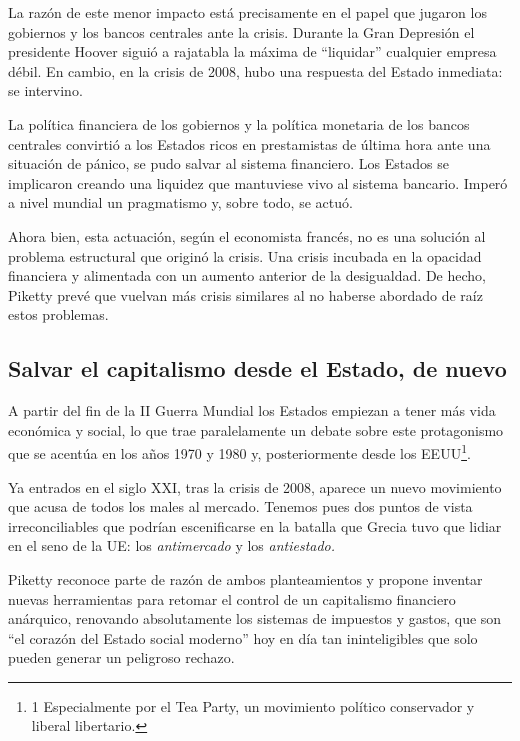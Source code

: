\documentclass[
]{article}
\begin{document}
La razón de este menor impacto está precisamente en el papel que jugaron
los gobiernos y los bancos centrales ante la crisis. Durante la Gran
Depresión el presidente Hoover siguió a rajatabla la máxima de
``liquidar'' cualquier empresa débil. En cambio, en la crisis de 2008,
hubo una respuesta del Estado inmediata: se intervino.

La política financiera de los gobiernos y la política monetaria de los
bancos centrales convirtió a los Estados ricos en prestamistas de última
hora ante una situación de pánico, se pudo salvar al sistema financiero.
Los Estados se implicaron creando una liquidez que mantuviese vivo al
sistema bancario. Imperó a nivel mundial un pragmatismo y, sobre todo,
se actuó.

Ahora bien, esta actuación, según el economista francés, no es una
solución al problema estructural que originó la crisis. Una crisis
incubada en la opacidad financiera y alimentada con un aumento anterior
de la desigualdad. De hecho, Piketty prevé que vuelvan más crisis
similares al no haberse abordado de raíz estos problemas.

\hypertarget{salvar-el-capitalismo-desde-el-estado-de-nuevo}{%
\subsection{Salvar el capitalismo desde el Estado, de
nuevo}\label{salvar-el-capitalismo-desde-el-estado-de-nuevo}}

A partir del fin de la II Guerra Mundial los Estados empiezan a tener
más vida económica y social, lo que trae paralelamente un debate sobre
este protagonismo que se acentúa en los años 1970 y 1980 y,
posteriormente desde los EEUU\footnote{1 Especialmente por el Tea Party,
  un movimiento político conservador y liberal libertario.}.

Ya entrados en el siglo XXI, tras la crisis de 2008, aparece un nuevo
movimiento que acusa de todos los males al mercado. Tenemos pues dos
puntos de vista irreconciliables que podrían escenificarse en la batalla
que Grecia tuvo que lidiar en el seno de la UE: los \emph{antimercado} y
los \emph{antiestado.}

Piketty reconoce parte de razón de ambos planteamientos y propone
inventar nuevas herramientas para retomar el control de un capitalismo
financiero anárquico, renovando absolutamente los sistemas de impuestos
y gastos, que son ``el corazón del Estado social moderno'' hoy en día
tan ininteligibles que solo pueden generar un peligroso rechazo.
\end{document}
